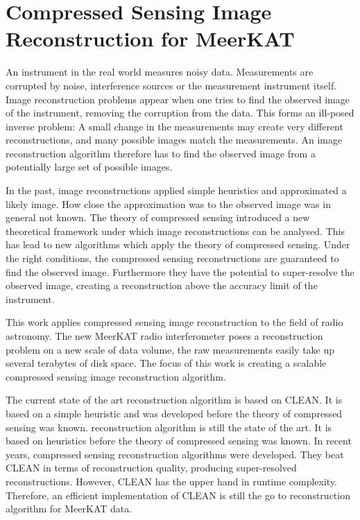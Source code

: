 \section{Compressed Sensing Image Reconstruction for MeerKAT} \label{intro}
An instrument in the real world measures noisy data. Measurements are corrupted by noise, interference sources or the measurement instrument itself. Image reconstruction problems appear when one tries to find the observed image of the instrument, removing the corruption from the data. This forms an ill-posed inverse problem: A small change in the measurements may create very different reconstructions, and many possible images match the measurements. An image reconstruction algorithm therefore has to find the observed image from a potentially large set of possible images.

In the past, image reconstructions applied simple heuristics and approximated a likely image. How close the approximation was to the observed image was in general not known. The theory of compressed sensing\cite{candes2006robust}\cite{donoho2006compressed} introduced a new theoretical framework under which image reconstructions can be analysed. This has lead to new algorithms which apply the theory of compressed sensing. Under the right conditions, the compressed sensing reconstructions are guaranteed to find the observed image. Furthermore they have the potential to super-resolve the observed image, creating a reconstruction above the accuracy limit of the instrument.

This work applies compressed sensing image reconstruction to the field of radio astronomy. The new MeerKAT radio interferometer poses a reconstruction problem on a new scale of data volume, the raw measurements easily take up several terabytes of disk space. The focus of this work is creating a scalable compressed sensing image reconstruction algorithm.

The current state of the art reconstruction algorithm is based on CLEAN\cite{rich2008multi}\cite{rau2011multi}. It is based on a simple heuristic and was developed before the theory of compressed sensing was known.   reconstruction algorithm is still the state of the art. It is based on heuristics before the theory of compressed sensing was known. In recent years, compressed sensing reconstruction algorithms were developed\cite{girard2015sparse}\cite{dabbech2018cygnus}\cite{birdi2018sparse}. They beat CLEAN in terms of reconstruction quality, producing super-resolved reconstructions. However, CLEAN has the upper hand in runtime complexity. Therefore, an efficient implementation of CLEAN is still the go to reconstruction algorithm for MeerKAT data.

